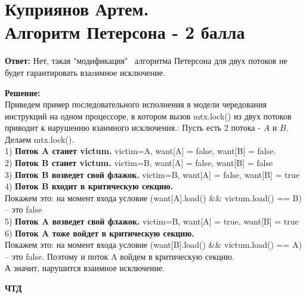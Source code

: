 \documentclass[a4paper,12pt]{paper} %
\begin{document}
\section{Куприянов Артем. \\ Алгоритм Петерсона - 2 балла} 
\textbf{Ответ: } Нет, такая "модификация" \ алгоритма Петерсона для двух потоков не будет гарантировать взаzимное исключение.


\textbf{Решение: } \\
Приведем пример последовательного исполнения в модели чередования инструкций на одном процессоре, в котором вызов mtx.lock() из двух потоков приводит к нарушению взаимного исключения.:
Пусть есть 2 потока -  $A$ и $B$. Делаем mtx.lock(). \\
1) \textbf{Поток A станет victum.} victim=A, want[A] = false, want[B] = false. \\
2) \textbf{Поток B станет victum.} victim=B, want[A] = false, want[B] = false \\
3) \textbf{Поток B возведет свой флажок.} victim=B, want[A] = false, want[B] = true\\
4) \textbf{Поток B входит в критическую секцию.} \\ Покажем это: на момент входа условие (want[A].load() \&\& victum.load() == B) -- это false \\
5) \textbf{Поток A возведет свой флажок.} victim=B, want[A] = true, want[B] = true\\
6) \textbf{Поток A тоже войдет в критическую секцию.} \\ Покажем это: на момент входа условие (want[B].load() \&\& victum.load() == A) -- это false. Поэтому и поток A войдем в критическую секцию. \\
А значит, нарушится взаимное исключение. 

\textbf{ЧТД}
\end{document}
